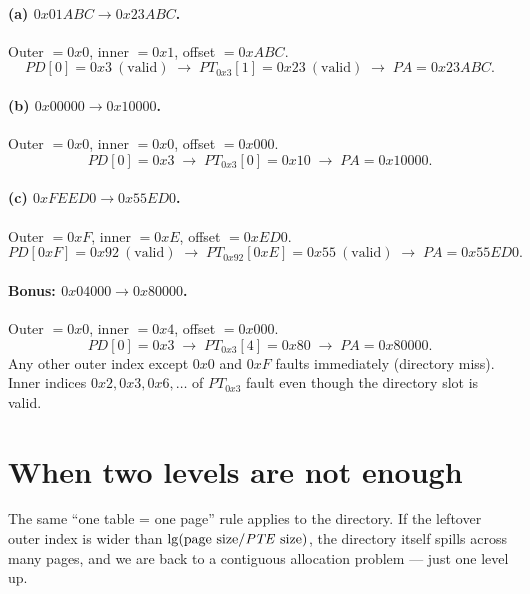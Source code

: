\documentclass[11pt,a4paper]{article}
\newcommand{\pa}{\textit{PA}}
\newcommand{\pte}{\textit{PTE}}
\begin{document}
\begin{solbox}[Walk]
\paragraph{(a) \(0x01ABC \to 0x23ABC\).}
Outer \(=0x0\), inner \(=0x1\), offset \(=0xABC\).
\[
  \textit{PD}[0]=0x3\ (\text{valid})
  \;\to\;
  \textit{PT}_{0x3}[1]=0x23\ (\text{valid})
  \;\to\;
  \pa=0x23ABC.
\]

\paragraph{(b) \(0x00000 \to 0x10000\).}
Outer \(=0x0\), inner \(=0x0\), offset \(=0x000\).
\[
  \textit{PD}[0]=0x3
  \;\to\;
  \textit{PT}_{0x3}[0]=0x10
  \;\to\;
  \pa=0x10000.
\]

\paragraph{(c) \(0xFEED0 \to 0x55ED0\).}
Outer \(=0xF\), inner \(=0xE\), offset \(=0xED0\).
\[
  \textit{PD}[0xF]=0x92\ (\text{valid})
  \;\to\;
  \textit{PT}_{0x92}[0xE]=0x55\ (\text{valid})
  \;\to\;
  \pa=0x55ED0.
\]

\paragraph{Bonus: \(0x04000 \to 0x80000\).}
Outer \(=0x0\), inner \(=0x4\), offset \(=0x000\).
\[
  \textit{PD}[0]=0x3
  \;\to\;
  \textit{PT}_{0x3}[4]=0x80
  \;\to\;
  \pa=0x80000.
\]
Any other outer index except \(0x0\) and \(0xF\) faults immediately
(directory miss). Inner indices \(0x2,0x3,0x6,\ldots\) of \(\textit{PT}_{0x3}\)
fault even though the directory slot is valid.
\end{solbox}

\section{When two levels are not enough}

The same ``one table = one page'' rule applies to the directory.
If the leftover outer index is wider than
\(\lg(\text{page size}/\text{\pte\ size})\), the directory itself
spills across many pages, and we are back to a contiguous allocation
problem --- just one level up.
\end{document}
